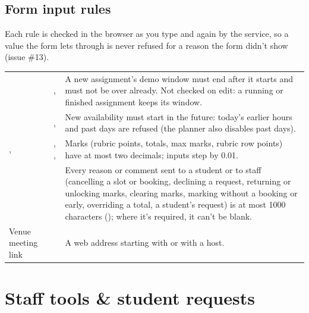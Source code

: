 \subsection{Form input rules}\label{sec:form-rules}

Each rule is checked in the browser as you type and again by the service, so a value the form lets
through is never refused for a reason the form didn't show (issue \#13).

{\tablefont
\begin{xltabular}{\linewidth}{@{}P{34mm} P{34mm} L@{}}
  \toprule
   &  & \\
  \midrule
  \endhead
   & ,  & A new assignment's demo window must end after it starts and must not be over already. Not checked on edit: a running or finished assignment keeps its window.\\
   & ,  & New availability must start in the future: today's earlier hours and past days are refused (the planner also disables past days).\\
  ,  & , ,  & Marks (rubric points, totals, max marks, rubric row points) have at most two decimals; inputs step by 0.01.\\
   &  & Every reason or comment sent to a student or to staff (cancelling a slot or booking, declining a request, returning or unlocking marks, clearing marks, marking without a booking or early, overriding a total, a student's request) is at most 1000 characters (); where it's required, it can't be blank.\\
  Venue meeting link &  & A web address starting with  or  with a host.\\
  \bottomrule
\end{xltabular}}

\section{Staff tools \& student requests}

